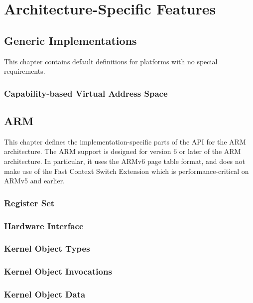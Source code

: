 \documentclass{ertos-book}
\begin{document}
\part{Architecture-Specific Features}

\chapter{Generic Implementations}

This chapter contains default definitions for platforms with no special requirements.

\section{Capability-based Virtual Address Space}


\chapter{ARM}

This chapter defines the implementation-specific parts of the API for the ARM architecture. The ARM support is designed for version 6 or later of the ARM architecture. In particular, it uses the ARMv6 page table format, and does not make use of the Fast Context Switch Extension which is performance-critical on ARMv5 and earlier.

\section{Register Set}


\section{Hardware Interface}


\section{Kernel Object Types}


\section{Kernel Object Invocations}


\section{Kernel Object Data}

\end{document}
